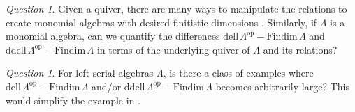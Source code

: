 \documentclass{conm-p-l}
\newcommand{\Findim}{\mathrm{Findim}\,}
\newcommand{\dell}{\mathrm{dell}\,}
\renewcommand{\dell}{\mathrm{dell}\,}
\newcommand{\op}{\mathrm{op}}
\newcommand{\ddell}{\mathrm{ddell}\,}
\theoremstyle{definition}
\theoremstyle{remark}
\newtheorem{question}[theorem]{Question}
\numberwithin{equation}{section}
\begin{document}
\begin{question}
Given a quiver, there are many ways to manipulate the relations to create monomial algebras with desired finitistic dimensions \cite{happel2013algebras}. Similarly, if $\Lambda$ is a monomial algebra, can we quantify the differences $\dell\Lambda^{\op}-\Findim\Lambda$ and $\ddell\Lambda^{\op}-\Findim\Lambda$ in terms of the underlying quiver of $\Lambda$ and its relations?
\end{question}

\begin{question}
For left serial algebras $\Lambda$, is there a class of examples where $\dell\Lambda^{\op}-\Findim\Lambda$ and/or $\ddell\Lambda^{\op}-\Findim\Lambda$ becomes arbitrarily large? This would simplify the example in \cite{barrios2024delooping}.
\end{question}



\end{document}
